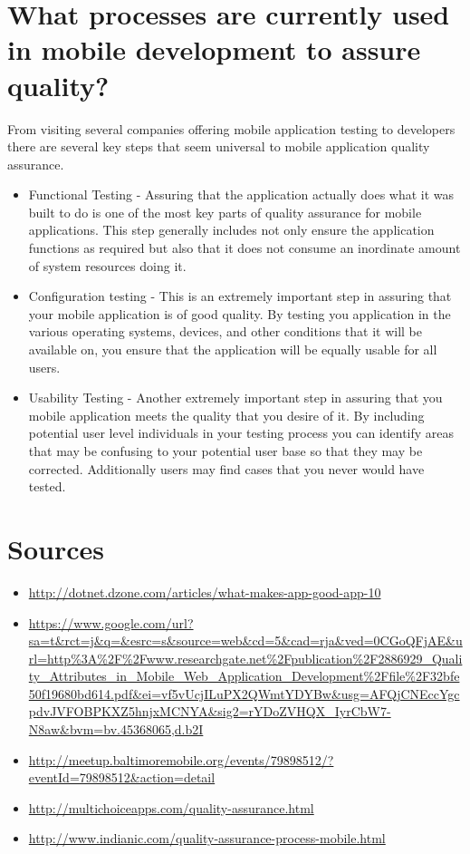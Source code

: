 \documentclass{article}
\begin{document}
	\section*{What processes are currently used in mobile development to assure quality?}
		From visiting several companies offering mobile application testing to developers there are several key steps that seem universal to mobile application quality assurance.
		\begin{itemize}
			\item Functional Testing - Assuring that the application actually does what it was built to do is one of the most key parts of quality assurance for mobile applications. This step generally includes not only ensure the application functions as required but also that it does not consume an inordinate amount of system resources doing it.
			\item Configuration testing - This is an extremely important step in assuring that your mobile application is of good quality. By testing you application in the various operating systems, devices, and other conditions that it will be available on, you ensure that the application will be equally usable for all users.
			\item Usability Testing - Another extremely important step in assuring that you mobile application meets the quality that you desire of it. By including potential user level individuals in your testing process you can identify areas that may be confusing to your potential user base so that they may be corrected. Additionally users may find cases that you never would have tested.
		\end{itemize}
	\section*{Sources}
		\begin{itemize}
			\item \url{http://dotnet.dzone.com/articles/what-makes-app-good-app-10}
			\item \url{https://www.google.com/url?sa=t&rct=j&q=&esrc=s&source=web&cd=5&cad=rja&ved=0CGoQFjAE&url=http%3A%2F%2Fwww.researchgate.net%2Fpublication%2F2886929_Quality_Attributes_in_Mobile_Web_Application_Development%2Ffile%2F32bfe50f19680bd614.pdf&ei=vf5vUcjILuPX2QWmtYDYBw&usg=AFQjCNEccYgcpdvJVFOBPKXZ5hnjxMCNYA&sig2=rYDoZVHQX_IyrCbW7-N8aw&bvm=bv.45368065,d.b2I}
			\item  \url{http://meetup.baltimoremobile.org/events/79898512/?eventId=79898512&action=detail}
			\item \url{http://multichoiceapps.com/quality-assurance.html}
			\item \url{http://www.indianic.com/quality-assurance-process-mobile.html}
		\end{itemize}
		
\end{document}

